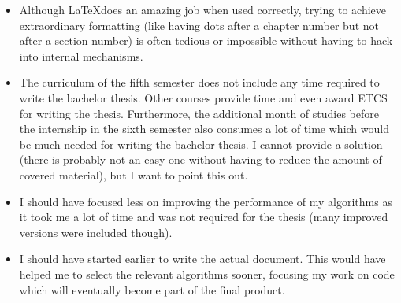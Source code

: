 \begin{itemize}
	\item[\negative] Although \LaTeX does an amazing job when used correctly, trying to achieve extraordinary formatting (like having dots after a chapter number but not after a section number) is often tedious or impossible without having to hack into internal mechanisms.
	
	\item[\negative] The curriculum of the fifth semester does not include any time required to write the bachelor thesis. Other courses provide time and even award ETCS for writing the thesis. Furthermore, the additional month of studies before the internship in the sixth semester also consumes a lot of time which would be much needed for writing the bachelor thesis. I cannot provide a solution (there is probably not an easy one without having to reduce the amount of covered material), but I want to point this out.
	
	\item[\negative] I should have focused less on improving the performance of my algorithms as it took me a lot of time and was not required for the thesis (many improved versions were included though).
	
	\item[\negative] I should have started earlier to write the actual document. This would have helped me to select the relevant algorithms sooner, focusing my work on code which will eventually become part of the final product.
	
\end{itemize}













